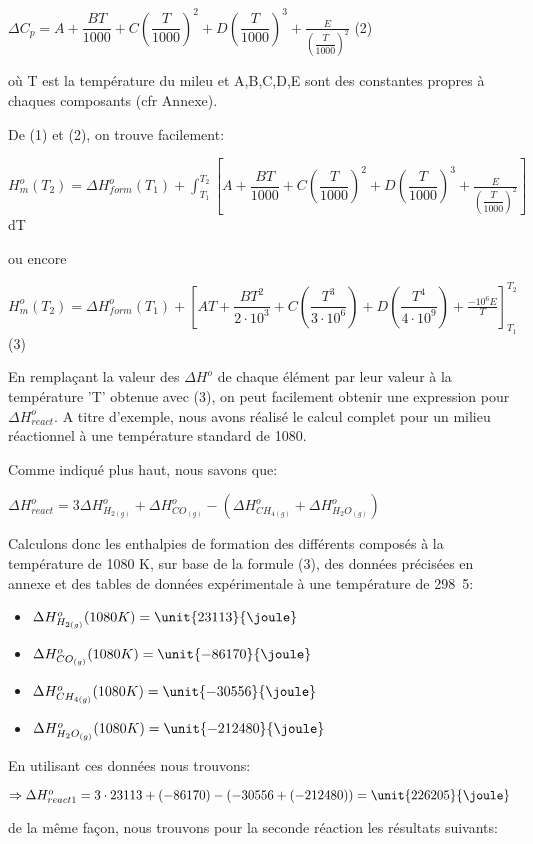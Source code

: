 \documentclass[11pt,a4paper]{report}
\begin{document}
$\Delta C_p=A+\dfrac{BT}{1000}+C(\dfrac{T}{1000})^2+D(\dfrac{T}{1000})^3+\frac{E}{(\dfrac{T}{1000})^2}$        (2)

où T est la température du mileu et A,B,C,D,E sont des constantes propres à chaques composants (cfr Annexe).

De (1) et (2), on trouve facilement:

$H^o_m(T_2)=\Delta H^o_{form}(T_1)+\int_{T_1}^{T_2} [A+\dfrac{BT}{1000}+C(\dfrac{T}{1000})^2+D(\dfrac{T}{1000})^3+\frac{E}{(\dfrac{T}{1000})^2}]$dT

ou encore

$H^o_m(T_2)=\Delta H^o_{form}(T_1) + [AT+\dfrac{BT^2}{2\cdot10^3}+C(\dfrac{T^3}{3\cdot10^6})+D(\dfrac{T^4}{4\cdot10^9})+\frac{-10^6E}{T}]^{T_2}_{T_1}$(3) 

En remplaçant la valeur des $\Delta H^o$ de chaque élément par leur valeur à la température 'T' obtenue avec (3), on peut facilement obtenir une expression pour $\Delta H^o_{react}$. A titre d'exemple, nous avons réalisé le calcul complet pour un milieu réactionnel à une température standard de \unit{1080}{\kelvin}.

Comme indiqué plus haut, nous savons que:

$\Delta H^o_{react}=3\Delta H^o_{H_{2(g)}} + \Delta H^o_{CO_{(g)}} - (\Delta H^o_{CH_{4(g)}} + \Delta H^o_{H_{2}O_{(g)}})$

Calculons donc les enthalpies de formation des différents composés à la température de 1080 K, sur base de la formule (3), des données précisées en annexe et des tables de données expérimentale à une température de \unit{298.5}{\kelvin}:

\begin{itemize}
\item{$\Delta H^o_{H_{2(g)}} (1080K)= \unit{23113}{\joule}$}
\item{$\Delta H^o_{CO_{(g)}} (1080K)= \unit{-86170}{\joule}$}
\item{$\Delta H^o_{CH_{4(g)}} (1080K)= \unit{-30556}{\joule}$}
\item{$\Delta H^o_{H_{2}O_{(g)}} (1080K)= \unit{-212480}{\joule}$}
\end{itemize}

En utilisant ces données nous trouvons:

$\Rightarrow \Delta H^o_{react1}= 3\cdot 23113 + (-86170) - (-30556 + (-212480))= \unit{226205}{\joule}$

de la même façon, nous trouvons pour la seconde réaction les résultats suivants:
\end{document}
